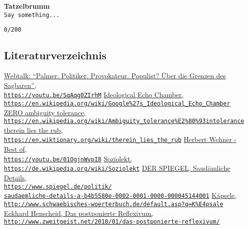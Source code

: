 \documentclass[a4,parindent=0pt]{article}
\begin{document}
\textbf{Tatzelbrumm}\\
\texttt{Say\ something...}

\texttt{0/200}

\subsection{Literaturverzeichnis}\label{literaturverzeichnis}

\begin{thebibliography}{88}
  \href{https://youtu.be/SqAqg0ZIrhM}{Webtalk: ``Palmer: Politiker.
  Provokateur. Populist? Über die Grenzen des Sagbaren'',\\
\texttt{https://youtu.be/SqAqg0ZIrhM}}
  \href{https://en.wikipedia.org/wiki/Google\%27s_Ideological_Echo_Chamber}{Ideological
  Echo Chamber,\\
\texttt{https://en.wikipedia.org/wiki/Google\%27s\_Ideological\_Echo\_Chamber}}
  \href{https://en.wikipedia.org/wiki/Ambiguity_tolerance\%E2\%80\%93intolerance}{ZERO
  ambiguity tolerance,\\
\texttt{https://en.wikipedia.org/wiki/Ambiguity\_tolerance\%E2\%80\%93intolerance}}
  \href{https://en.wiktionary.org/wiki/therein_lies_the_rub}{therein
  lies the rub,\\
\texttt{https://en.wiktionary.org/wiki/therein\_lies\_the\_rub}}
  \href{https://youtu.be/01OgjnWvpI8}{Herbert Wehner - Best of,\\
\texttt{https://youtu.be/01OgjnWvpI8}}
  \href{https://de.wikipedia.org/wiki/Soziolekt}{Soziolekt,\\
\texttt{https://de.wikipedia.org/wiki/Soziolekt}}
  \href{https://www.spiegel.de/politik/saudaemliche-details-a-b4b5580e-0002-0001-0000-000045144001}{DER SPIEGEL, Saudämliche
  Details,\\
\texttt{https://www.spiegel.de/politik/\\saudaemliche-details-a-b4b5580e-0002-0001-0000-000045144001}}
  \href{http://www.schwaebisches-woerterbuch.de/default.asp?q=K\%E4psale}{Käpsele,\\
\texttt{http://www.schwaebisches-woerterbuch.de/default.asp?q=K\%E4psale}}
  \href{http://www.zweitgeist.net/2010/01/das-postponierte-reflexivum/}{Eckhard Henscheid, Das
  postponierte Reflexivum,\\
\texttt{http://www.zweitgeist.net/2010/01/das-postponierte-reflexivum/}}

\end{thebibliography}
\end{document}

